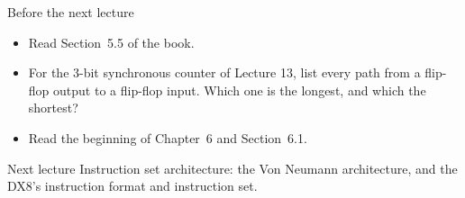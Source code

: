 \documentclass[10pt]{wosm-slides}
\begin{document}
\begin{frame}{Before the next lecture}
  \begin{itemize}
    \item Read Section~5.5 of the book.
    \item For the 3-bit synchronous counter of Lecture 13, list every path from a
      flip-flop output to a flip-flop input. Which one is the longest, and which the
      shortest?
    \item Read the beginning of Chapter~6 and Section~6.1.
  \end{itemize}

  \begin{block}{Next lecture }
    Instruction set architecture: the Von Neumann architecture, and the DX8's
    instruction format and instruction set.
  \end{block}
\end{frame}
\end{document}
